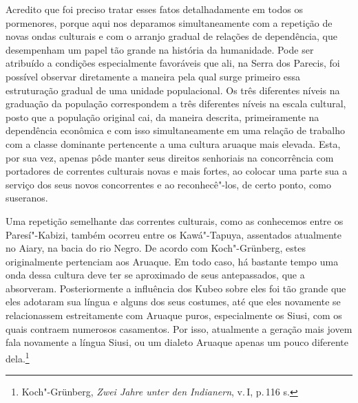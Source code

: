 Acredito que foi preciso tratar esses fatos detalhadamente em todos os
pormenores, porque aqui nos deparamos simultaneamente com a repetição
de novas ondas culturais e com o arranjo gradual de relações de
dependência, que desempenham um papel tão grande na história da
humanidade. Pode ser atribuído a condições especialmente favoráveis que
ali, na Serra dos Parecis, foi possível observar diretamente a maneira
pela qual surge primeiro essa estruturação gradual de uma unidade
populacional. Os três diferentes níveis na graduação da população
correspondem a três diferentes níveis na escala cultural, posto que a
população original cai, da maneira descrita, primeiramente na
dependência econômica e com isso simultaneamente em uma relação de
trabalho com a classe dominante pertencente a uma cultura aruaque mais
elevada. Esta, por sua vez, apenas pôde manter seus direitos senhoriais
na concorrência com portadores de correntes culturais novas e mais
fortes, ao colocar uma parte sua a serviço dos seus novos concorrentes e
ao reconhecê"-los, de certo ponto, como suseranos.

Uma repetição semelhante das correntes culturais, como as conhecemos
entre os Paresí"-Kabizi, também ocorreu entre os Kawá"-Tapuya, assentados
atualmente no Aiary, na bacia do rio Negro. De acordo com Koch"-Grünberg,
estes originalmente pertenciam aos Aruaque. Em todo caso, há bastante
tempo uma onda dessa cultura deve ter se aproximado de seus
antepassados, que a absorveram. Posteriormente a influência dos Kubeo
sobre eles foi tão grande que eles adotaram sua língua e alguns dos seus
costumes, até que eles novamente se relacionassem estreitamente com
Aruaque puros, especialmente os Siusi, com os quais contraem numerosos
casamentos. Por isso, atualmente a geração mais jovem fala novamente a
língua Siusi, ou um dialeto Aruaque apenas um pouco diferente
dela.\footnote{Koch"-Grünberg, \textit{Zwei Jahre unter den Indianern}, v.\,\textsc{I}, p.\,116 s.}

